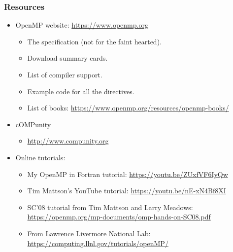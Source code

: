 \documentclass[aspectratio=169]{beamer}
\begin{document}
 \begin{frame}
 \frametitle{Resources}
 \begin{itemize}
 \item OpenMP website: \url{https://www.openmp.org}
   \begin{itemize}
     \item The specification (not for the faint hearted).
     \item Download summary cards.
     \item List of compiler support.
     \item Example code for all the directives.
     \item List of books: \url{https://www.openmp.org/resources/openmp-books/}
   \end{itemize}
 
 \item cOMPunity
   \begin{itemize}
     \item \url{http://www.compunity.org}
   \end{itemize}
 
 \item Online tutorials:
   \begin{itemize}
     \item My OpenMP in Fortran tutorial: \url{https://youtu.be/ZUxfVF6IyQw}
     \item Tim Mattson's YouTube tutorial: \url{https://youtu.be/nE-xN4Bf8XI}
     \item SC'08 tutorial from Tim Mattson and Larry Meadows: \url{https://openmp.org/mp-documents/omp-hands-on-SC08.pdf}
     \item From Lawrence Livermore National Lab: \url{https://computing.llnl.gov/tutorials/openMP/}
   \end{itemize}
 
 \end{itemize}
 
 \end{frame}

\end{document}
